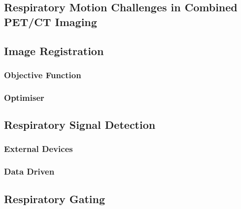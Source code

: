         \subsection{Respiratory Motion Challenges in Combined PET/CT Imaging} \label{respiratory_motion_challenges_in_combined_pet_ct_imaging}
            \blindtext
    
        \blindtext
    
        \subsection{Image Registration} \label{image_registration}
            \blindtext
            
            \subsubsection{Objective Function} \label{image_registration_objective_function}
                \blindtext
                
            \subsubsection{Optimiser} \label{image_registration_optimiser}
                \blindtext
            
        \subsection{Respiratory Signal Detection} \label{respiratory_signal_detection}
            \blindtext
            
            \subsubsection{External Devices} \label{external_devices}
                \blindtext
                
            \subsubsection{Data Driven} \label{data_driven}
                \blindtext
                
        \subsection{Respiratory Gating} \label{respiratory_gating}
            \blindtext
            
